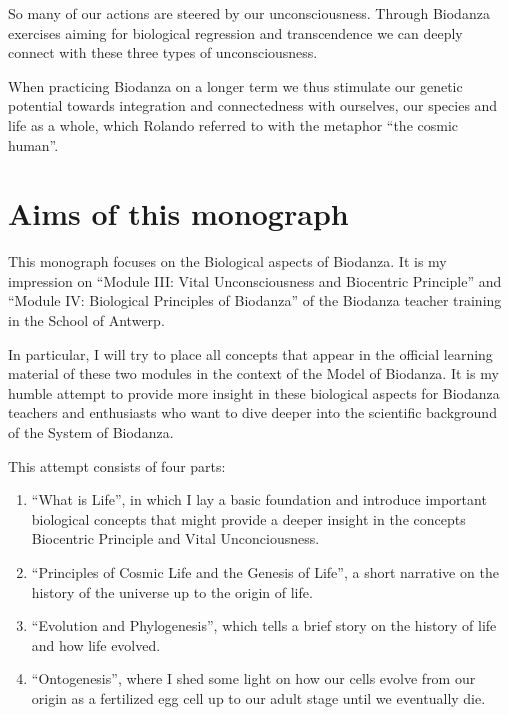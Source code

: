 \documentclass[
  11pt,
]{book}
\begin{document}
So many of our actions are steered by our unconsciousness.
Through Biodanza exercises aiming for biological regression and transcendence we can deeply connect with these three types of unconsciousness.

When practicing Biodanza on a longer term we thus stimulate our genetic potential towards integration and connectedness with ourselves, our species and life as a whole, which Rolando referred to with the metaphor ``the cosmic human''.

\newpage

\hypertarget{aims-of-this-monograph}{%
\section{Aims of this monograph}\label{aims-of-this-monograph}}

This monograph focuses on the Biological aspects of Biodanza. It is my impression on ``Module III: Vital Unconsciousness and Biocentric Principle'' and ``Module IV: Biological Principles of Biodanza'' of the Biodanza teacher training in the School of Antwerp.

In particular, I will try to place all concepts that appear in the official learning material of these two modules in the context of the Model of Biodanza. It is my humble attempt to provide more insight in these biological aspects for Biodanza teachers and enthusiasts who want to dive deeper into the scientific background of the System of Biodanza.

This attempt consists of four parts:

\begin{enumerate}
\def\labelenumi{\arabic{enumi}.}
\item
  ``What is Life'', in which I lay a basic foundation and introduce important biological concepts that might provide a deeper insight in the concepts Biocentric Principle and Vital Unconciousness.
\item
  ``Principles of Cosmic Life and the Genesis of Life'', a short narrative on the history of the universe up to the origin of life.
\item
  ``Evolution and Phylogenesis'', which tells a brief story on the history of life and how life evolved.
\item
  ``Ontogenesis'', where I shed some light on how our cells evolve from our origin as a fertilized egg cell up to our adult stage until we eventually die.
\end{enumerate}
\end{document}
